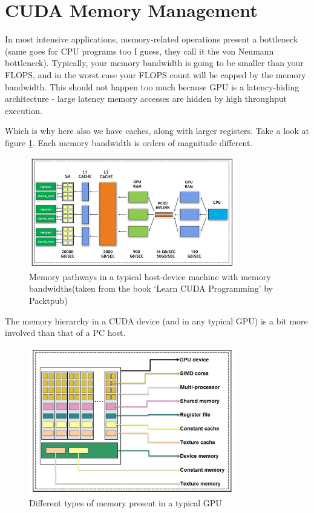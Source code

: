 \section*{CUDA Memory Management}
In most intensive applications, memory-related operations present a
bottleneck (same goes for CPU programs too I guess, they call it
the von Neumann bottleneck). Typically, your memory bandwidth
is going to be smaller than your FLOPS, and in the worst case your
FLOPS count will be capped by the memory bandwidth. This should not
happen too much because GPU is a latency-hiding architecture - large
latency memory accesses are hidden by high throughput execution.

Which is why here also we have caches, along with larger registers.
Take a look at figure \ref{fig:figures-memory-png}. Each memory
bandwidth is orders of magnitude different.

\begin{figure}[h]
    \centering
    \includegraphics[width=0.8\textwidth]{figures/memory.png}
    \caption{Memory pathways in a typical host-device machine with memory bandwidths(taken
    from the book `Learn CUDA Programming' by Packtpub)}
    \label{fig:figures-memory-png}
\end{figure}

The memory hierarchy in a CUDA device (and in any typical GPU) is
a bit more involved than that of a PC host.
\begin{figure}[h]
    \centering
    \includegraphics[width=0.8\textwidth]{figures/mem-hierarchy.png}
    \caption{Different types of memory present in a typical GPU}
    \label{fig:figures-mem-hierarchy-png}
\end{figure}

